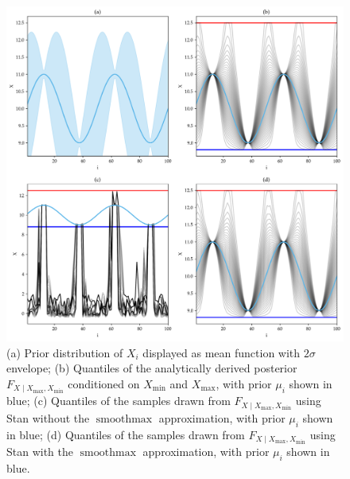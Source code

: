 \documentclass[letter]{article}
\makeatletter
\def\maxwidth{\ifdim\Gin@nat@width>\linewidth\linewidth
\else\Gin@nat@width\fi}
\let\Oldincludegraphics\includegraphics
\renewcommand{\includegraphics}[1]{\Oldincludegraphics[width=.8\maxwidth]{#1}}
\DeclareMathOperator*{\softmax}{smoothmax}
\newcommand{\Xmax}{X_{\max}}
\newcommand{\Xmin}{X_{\min}}
\newcommand{\Fcond}{F_{X \mid \Xmax,\Xmin}}
\makeatother
\begin{document}
        \begin{figure}
\centering
\includegraphics{figures/toy_quantiles.png}
\caption{\label{fig:toy_quantiles}(a) Prior distribution of \(X_i\) displayed as mean function with \(2\sigma\) envelope; (b) Quantiles of the analytically derived posterior \(\Fcond\) conditioned on \(\Xmin\) and \(\Xmax\), with prior \(\mu_i\) shown in blue; (c) Quantiles of the samples drawn from \(\Fcond\) using Stan without the \(\softmax\) approximation, with prior \(\mu_i\) shown in blue; (d) Quantiles of the samples drawn from \(\Fcond\) using Stan with the \(\softmax\) approximation, with prior \(\mu_i\) shown in blue.}
\end{figure}
\end{document}
